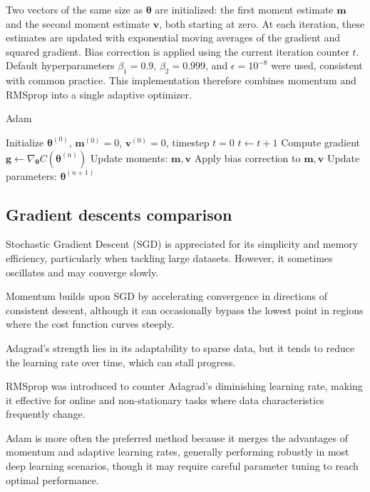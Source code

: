\documentclass[
 reprint,            %
 amsmath,amssymb,
 aps,
]{revtex4-2}
\begin{document}
Two vectors of the same size as $\boldsymbol{\theta}$ are initialized: the first moment estimate $\mathbf{m}$ and the second moment estimate $\mathbf{v}$, both starting at zero. At each iteration, these estimates are updated with exponential moving averages of the gradient and squared gradient. Bias correction is applied using the current iteration counter $t$.
Default hyperparameters $\beta_1=0.9$, $\beta_2=0.999$, and $\epsilon=10^{-8}$ were used, consistent with common practice. This implementation therefore combines momentum and RMSprop into a single adaptive optimizer.
\begin{algorithm}[H]
\caption{Adam}
\begin{algorithmic}[1]
\State Initialize $\boldsymbol{\theta}^{(0)}$, $\mathbf{m}^{(0)}=0$, $\mathbf{v}^{(0)}=0$, timestep $t=0$
\State $t \gets t+1$
\State Compute gradient $\mathbf{g} \gets \nabla_{\boldsymbol{\theta}} C(\boldsymbol{\theta}^{(n)})$
\State Update moments: $\mathbf{m}, \mathbf{v}$
\State Apply bias correction to $\mathbf{m}, \mathbf{v}$
\State Update parameters: $\boldsymbol{\theta}^{(n+1)}$
\EndFor
\end{algorithmic}
\end{algorithm}

\subsection{Gradient descents comparison}
Stochastic Gradient Descent (SGD) is appreciated for its simplicity and memory efficiency, particularly when tackling large datasets. However, it sometimes oscillates and may converge slowly. 

Momentum builds upon SGD by accelerating convergence in directions of consistent descent, although it can occasionally bypass the lowest point in regions where the cost function curves steeply. 

Adagrad's strength lies in its adaptability to sparse data, but it tends to reduce the learning rate over time, which can stall progress. 

RMSprop was introduced to counter Adagrad's diminishing learning rate, making it effective for online and non-stationary tasks where data characteristics frequently change. 

Adam is more often the preferred method because it merges the advantages of momentum and adaptive learning rates, generally performing robustly in most deep learning scenarios, though it may require careful parameter tuning to reach optimal performance. \cite{goodfellow2016}
\end{document}
